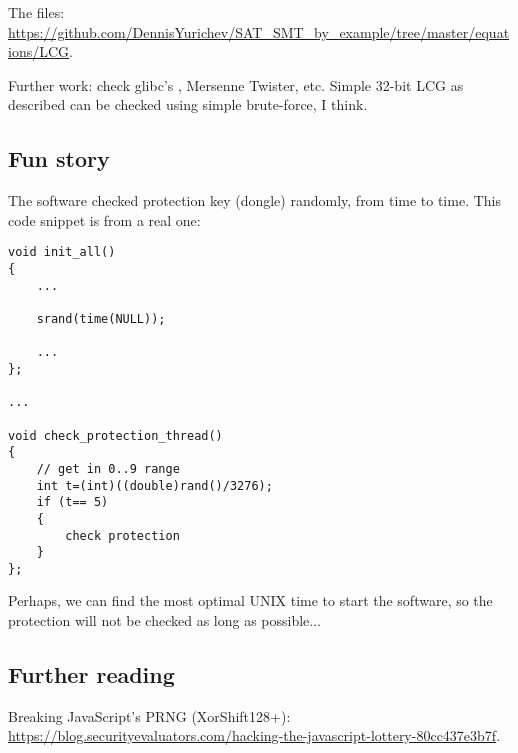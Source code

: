 The files: \url{https://github.com/DennisYurichev/SAT_SMT_by_example/tree/master/equations/LCG}.

Further work: check glibc's , Mersenne Twister, etc. Simple 32-bit LCG as described can be checked using simple brute-force, I think.

\subsection{Fun story}

The software checked protection key (dongle) randomly, from time to time.
This code snippet is from a real one:

\begin{lstlisting}[style=customc]
void init_all()
{
	...

	srand(time(NULL));

	...
};

...

void check_protection_thread()
{
	// get in 0..9 range
	int t=(int)((double)rand()/3276);
	if (t== 5)
	{
		check protection
	}
};
\end{lstlisting}

Perhaps, we can find the most optimal UNIX time to start the software, so the protection will not be checked as long as possible...

\subsection{Further reading}

Breaking JavaScript's \ac{PRNG} (XorShift128+):
\url{https://blog.securityevaluators.com/hacking-the-javascript-lottery-80cc437e3b7f}.

